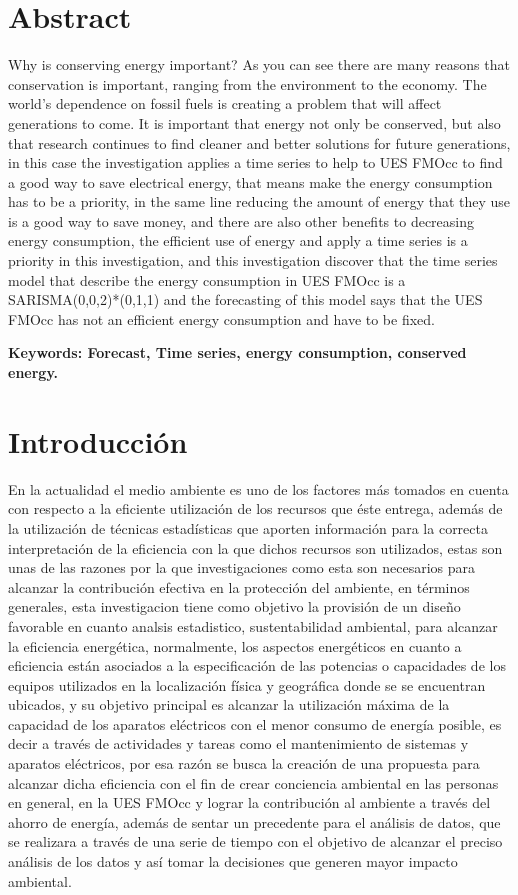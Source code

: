 \documentclass[12pt,letterpaper]{report}
\begin{document}
\chapter*{Abstract}
Why is conserving energy important? As you can see there are many reasons that conservation is important, ranging from the environment to the economy. The world's dependence on fossil fuels is creating a problem that will affect generations to come. It is important that energy not only be conserved, but also that research continues to find cleaner and better solutions for future generations, in this case the investigation applies a time series to help to UES FMOcc to find a good way to save electrical energy, that means make the energy consumption has to be a priority, in the same line reducing the amount of energy  that they use is a good way to save money, and there are also other benefits to decreasing energy consumption, the efficient use of energy and apply a time series is a priority in this investigation, and this investigation discover that the time series model that describe the energy consumption in UES FMOcc is a SARISMA(0,0,2)*(0,1,1) and the forecasting of this model says that the UES FMOcc has not an efficient energy consumption and have to be fixed.


\textbf{Keywords: Forecast, Time series, energy consumption, conserved energy.}
\chapter*{Introducción}

En la actualidad el medio ambiente es uno de los factores más tomados en cuenta con respecto
a la eficiente utilización de los recursos que éste entrega, además de la utilización de técnicas
estadísticas que aporten información para la correcta interpretación de la eficiencia con la que
dichos recursos son utilizados, estas son unas de las razones por la que investigaciones como esta
son necesarios para alcanzar la contribución efectiva en la protección del ambiente, en
términos generales, esta investigacion tiene como objetivo la provisión de 
un diseño favorable en cuanto analsis estadistico, sustentabilidad
ambiental, para alcanzar la eficiencia energética,
normalmente, los aspectos energéticos en cuanto a eficiencia están asociados a la especificación de
las potencias o capacidades de los equipos utilizados en la localización física y geográfica
donde se se encuentran ubicados, y su objetivo principal es alcanzar la utilización máxima de la
capacidad de los aparatos eléctricos con el menor consumo de energía posible, es decir a
través de actividades y tareas como el mantenimiento de sistemas y aparatos eléctricos, por esa
razón se busca la creación de una propuesta para alcanzar dicha eficiencia con el
fin de crear conciencia ambiental en las personas en general, en la UES FMOcc y lograr la
contribución al ambiente a través del ahorro de energía, además de sentar un precedente para
el análisis de datos, que se realizara a través de una serie de tiempo con el objetivo de alcanzar
el preciso análisis de los datos y así tomar la decisiones que generen mayor impacto ambiental.
\end{document}
